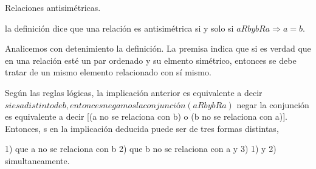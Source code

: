 \documentclass{article}
\begin{document}
Relaciones antisimétricas.

la definición dice que una relación es antisimétrica si y solo si $aRb y bRa \Rightarrow a=b$.

Analicemos con detenimiento la definición.
La premisa indica que si es verdad que en una relación esté un par ordenado y su elmento simétrico, entonces se debe tratar de un mismo elemento relacionado con sí mismo. 

Según las reglas lógicas, la implicación anterior es equivalente a decir
$si es a distinto de b, entonces negamos la conjunción (aRb y bRa)$
negar la conjunción es equivalente a decir [(a no se relaciona con b) o (b no se relaciona con a)]. Entonces, s en la implicación deducida puede ser de tres formas distintas, 

1) que a no se relaciona con b
2) que b no se relaciona con a
y
3) 1) y 2) simultaneamente.
\end{document}

